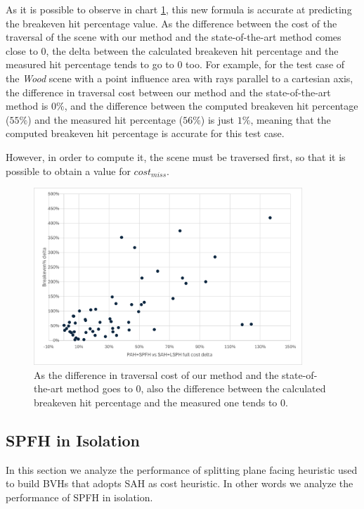 \documentclass{PoliMi_MasterThesis}
\begin{document}
As it is possible to observe in chart \ref{fig:breakeven_hit_perc_accuracy}, this new formula is accurate at predicting the breakeven hit percentage value. As the difference between the cost of the traversal of the scene with our method and the state-of-the-art method comes close to 0, the delta between the calculated breakeven hit percentage and the measured hit percentage tends to go to 0 too. For example, for the test case of the \textit{Wood} scene with a point influence area with rays parallel to a cartesian axis, the difference in traversal cost between our method and the state-of-the-art method is $0\%$, and the difference between the computed breakeven hit percentage ($55\%$) and the measured hit percentage ($56\%$) is just $1\%$, meaning that the computed breakeven hit percentage is accurate for this test case.

However, in order to compute it, the scene must be traversed first, so that it is possible to obtain a value for $cost_{miss}$.

\begin{figure}[H] 
	\centering
	\includegraphics[width=0.9\textwidth]{Images/breakeven_hit_perc_accuracy.png}
	\caption{As the difference in traversal cost of our method and the state-of-the-art method goes to 0, also the difference between the calculated breakeven hit percentage and the measured one tends to 0.}
	\label{fig:breakeven_hit_perc_accuracy}
\end{figure}

\subsection{SPFH in Isolation} \label{ssec:spfh_in_isolation}
In this section we analyze the performance of splitting plane facing heuristic used to build BVHs that adopts SAH as cost heuristic. In other words we analyze the performance of SPFH in isolation.
\end{document}
